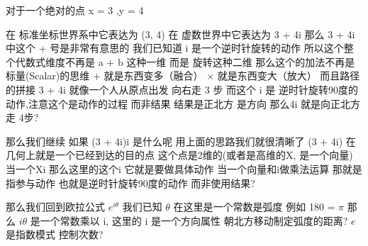 \documentclass[12pt]{article}
\begin{document}
\begin{flushleft}
    对于一个绝对的点 x = 3 ,y = 4

    在 标准坐标世界系中它表达为 (3, 4)
    在 虚数世界中它表达为 3 + 4i
    那么 3 + 4i 中这个 + 号是非常有意思的
    我们已知道 i 是一个逆时针旋转的动作 所以这个整个代数式维度不再是 a + b 这种一维 而是 旋转这种二维
    那么这个的加法不再是 标量(Scalar)的思维
    + 就是东西变多（融合）
    × 就是东西变大（放大）
    而且路径的拼接
    3 + 4i 就像一个人从原点出发 向右走 3 步 而这个 i 是 逆时针旋转90度的动作,注意这个是动作的过程 而非结果 结果是正北方 是方向
    那么4i 就是向正北方走 4步?

    那么我们继续 如果 (3 + 4i)i 是什么呢 用上面的思路我们就很清晰了
    (3 + 4i) 在几何上就是一个已经到达的目的点 这个点是2维的(或者是高维的X, 是一个向量) 当一个Xi 那么这里的这个i 它就是要做具体动作
    当一个向量和i做乘法运算 那就是指参与动作 也就是逆时针旋转90度的动作 而非使用结果?

    那么我们回到欧拉公式 $e^{i\theta}$  我们已知 $\theta$ 在这里是一个常数是弧度 例如 180 = $\pi$
    那么 $i\theta$ 是一个常数乘以 i, 这里的 i 是一个方向属性 朝北方移动制定弧度的距离? $e^{}$ 是指数模式 控制次数?

\end{flushleft}
\end{document}
